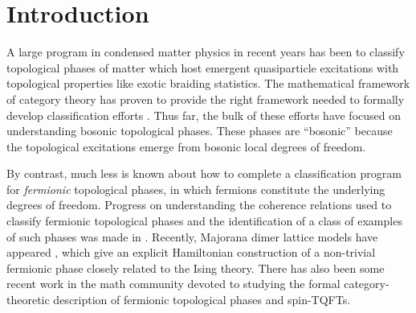 
\section{Introduction}


A large program in condensed matter physics in recent years has been to classify 
topological phases of matter which host emergent quasiparticle excitations 
with topological properties like exotic braiding statistics. 
The mathematical framework of category theory has proven to provide the right 
framework needed to formally develop classification efforts \cite{kitaev2006}. 
Thus far, the bulk of these efforts have focused on understanding bosonic topological phases.
These phases are ``bosonic'' because the topological excitations emerge from bosonic 
local degrees of freedom.

By contrast, much less is known about how to complete a classification program for {\it fermionic} topological phases, in which fermions constitute 
the underlying degrees of freedom. 
Progress on understanding the coherence relations used to classify fermionic topological phases and the identification of a class of examples of such phases was made in \cite{gu2015,gu2014,Lan2016b}. 
Recently, Majorana dimer lattice models have appeared \cite{tarantino2016,ware2016}, 
which give an explicit Hamiltonian construction of a 
non-trivial
fermionic phase closely related to the Ising theory. 
There has also been some recent work in the math community \cite{usher2016,brundan2016,bruillard2017,bonderson2017} 
devoted to studying the formal category-theoretic description of fermionic topological phases and spin-TQFTs. 

